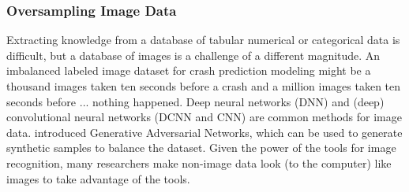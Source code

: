\subsubsection{Oversampling Image Data}

Extracting knowledge from a database of tabular numerical or categorical data is difficult, but a database of images is a challenge of a different magnitude.  An imbalanced labeled image dataset for crash prediction modeling might be a thousand images taken ten seconds before a crash and a million images taken ten seconds before ... nothing happened.  Deep neural networks (DNN) and (deep) convolutional neural networks (DCNN and CNN) are common methods for image data.  \cite{NIPS2014_5ca3e9b1} introduced Generative Adversarial Networks, which can be used to generate synthetic samples to balance the dataset.  Given the power of the tools for image recognition, many researchers make non-image data look (to the computer) like images to take advantage of the tools.  

